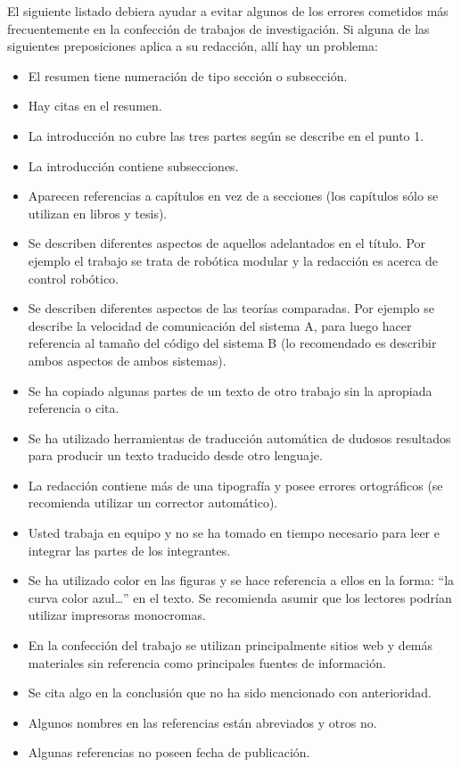 El siguiente listado debiera ayudar a evitar algunos de los errores cometidos más frecuentemente en la confección de trabajos de investigación. Si alguna de las siguientes preposiciones aplica a su redacción, allí hay un problema:
 \begin{itemize} %
    \item El resumen tiene numeración de tipo sección o subsección.
    \item Hay citas en el resumen.
    \item La introducción no cubre las tres partes según se describe en el punto 1.
    \item La introducción contiene subsecciones.
    \item Aparecen referencias a capítulos en vez de a secciones (los capítulos sólo se utilizan en libros y tesis).
    \item Se describen diferentes aspectos de aquellos adelantados en el título. Por ejemplo el trabajo se trata de robótica modular y la redacción es acerca de control robótico.
    \item Se describen diferentes aspectos de las teorías comparadas. Por ejemplo se describe la velocidad de comunicación del sistema A, para luego hacer referencia al tamaño del código del sistema B (lo recomendado es describir ambos aspectos de ambos sistemas).
    \item Se ha copiado algunas partes de un texto de otro trabajo sin la apropiada referencia o cita.
    \item Se ha utilizado herramientas de traducción automática de dudosos resultados para producir un texto traducido desde otro lenguaje.
    \item La redacción contiene más de una tipografía y posee errores ortográficos (se recomienda utilizar un corrector automático).
    \item Usted trabaja en equipo y no se ha tomado en tiempo necesario para leer e integrar las partes de los integrantes.
    \item Se ha utilizado color en las figuras y se hace referencia a ellos en la forma: “la curva color azul…” en el texto. Se recomienda asumir que los lectores podrían utilizar impresoras monocromas.
    \item En la confección del trabajo se utilizan principalmente sitios web y demás materiales sin referencia como principales fuentes de información.
    \item Se cita algo en la conclusión que no ha sido mencionado con anterioridad.
    \item Algunos nombres en las referencias están abreviados y otros no.
    \item Algunas referencias no poseen fecha de publicación.
\end{itemize}    
    